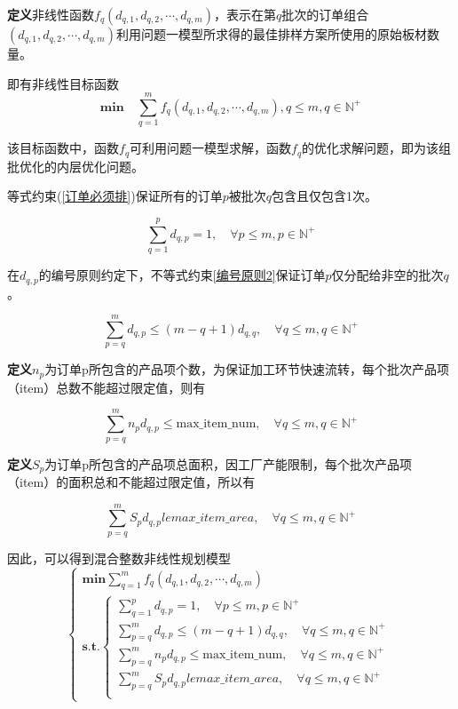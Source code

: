 \documentclass[bwprint]{gmcmthesis}
\begin{document}
\textbf{定义}非线性函数$f_q(d_{q,1},d_{q,2},\cdots,d_{q,m})$，表示在第$q$批次的订单组合$(d_{q,1},d_{q,2},\cdots,d_{q,m})$利用问题一模型所求得的最佳排样方案所使用的原始板材数量。

即有非线性目标函数
\begin{equation}   
    \mathbf{min}\quad\sum_{q=1}^{m} f_q(d_{q,1},d_{q,2},\cdots,d_{q,m}),q\le m ,q\in  \mathbb{N}^+\label{目标函数2}
\end{equation}

该目标函数中，函数$f_q$可利用问题一模型求解，函数$f_q$的优化求解问题，即为该组批优化的内层优化问题。

等式约束(\ref{订单必须排})保证所有的订单$p$被批次$q$包含且仅包含1次。

\begin{equation}   
    \sum_{q=1}^{p} d_{q,p}=1,\quad \forall p\le m,p \in \mathbb{N}^+ \label{订单必须排} 
\end{equation}


在$d_{q,p}$的编号原则约定下，不等式约束\ref{编号原则2}保证订单$p$仅分配给非空的批次$q$。

\begin{equation}   
\sum_{p=q}^{m} d_{q,p} \le (m-q+1)d_{q,q},\quad \forall q\le m,q\in \mathbb{N}^+\label{编号原则2}
\end{equation}

\textbf{定义}$n_p$为订单p所包含的产品项个数，为保证加工环节快速流转，每个批次产品项（item）总数不能超过限定值，则有

\begin{equation}   
    \sum_{p=q}^{m} n_pd_{q,p} \le \text{max\_item\_num},\quad \forall q \le m, q\in \mathbb{N}^+
\end{equation}

\textbf{定义}$S_p$为订单p所包含的产品项总面积，因工厂产能限制，每个批次产品项（item）的面积总和不能超过限定值，所以有

\begin{equation}   
    \sum_{p=q}^{m} S_pd_{q,p} le max\_item\_area,\quad \forall q\le m,q\in \mathbb{N}^+
\end{equation}

因此，可以得到混合整数非线性规划模型
\begin{equation}
    \begin{cases}
        \mathbf{min} \sum_{q=1}^{m} f_q(d_{q,1},d_{q,2},\cdots,d_{q,m}) \\
        \mathbf{s.t.}
        \begin{cases}
            \sum_{q=1}^{p} d_{q,p}=1,\quad \forall p\le m,p \in \mathbb{N}^+ \\
            \sum_{p=q}^{m} d_{q,p} \le (m-q+1)d_{q,q},\quad \forall q\le m,q\in \mathbb{N}^+  \\
            \sum_{p=q}^{m} n_pd_{q,p} \le \text{max\_item\_num},\quad \forall q \le m, q\in \mathbb{N}^+\\
            \sum_{p=q}^{m} S_pd_{q,p} le max\_item\_area,\quad \forall q\le m,q\in \mathbb{N}^+ \\
        \end{cases}  \label{问题二模型}
    \end{cases}
\end{equation}
\end{document}
